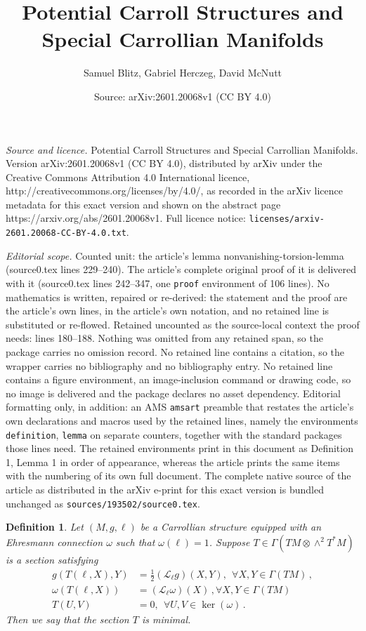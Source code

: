 \documentclass[10pt,a4paper]{amsart}
\title{Potential Carroll Structures and Special Carrollian Manifolds}
\author{Samuel Blitz, Gabriel Herczeg, David McNutt}
\date{Source: arXiv:2601.20068v1 (CC BY 4.0)}
\newtheorem{definition}{Definition}
\begin{document}
\maketitle

\noindent\emph{Source and licence.} Potential Carroll Structures and Special Carrollian Manifolds. Version arXiv:2601.20068v1 (CC BY 4.0), distributed by arXiv under the Creative Commons Attribution 4.0 International licence, http://creativecommons.org/licenses/by/4.0/, as recorded in the arXiv licence metadata for this exact version and shown on the abstract page https://arxiv.org/abs/2601.20068v1. Full licence notice: \texttt{licenses/arxiv-2601.20068-CC-BY-4.0.txt}.\par\smallskip

\noindent\textit{Editorial scope.} Counted unit: the article's lemma nonvanishing-torsion-lemma (source0.tex lines 229--240). The article's complete original proof of it is delivered with it (source0.tex lines 242--347, one \texttt{proof} environment of 106 lines). No mathematics is written, repaired or re-derived: the statement and the proof are the article's own lines, in the article's own notation, and no retained line is substituted or re-flowed.  Retained uncounted as the source-local context the proof needs: lines 180--188.  Nothing was omitted from any retained span, so the package carries no omission record.  No retained line contains a citation, so the wrapper carries no bibliography and no bibliography entry.  No retained line contains a figure environment, an image-inclusion command or drawing code, so no image is delivered and the package declares no asset dependency.  Editorial formatting only, in addition: an AMS \texttt{amsart} preamble that restates the article's own declarations and macros used by the retained lines, namely the environments \texttt{definition}, \texttt{lemma} on separate counters, together with the standard packages those lines need.  The retained environments print in this document as Definition 1, Lemma 1 in order of appearance, whereas the article prints the same items with the numbering of its own full document.  The complete native source of the article as distributed in the arXiv e-print for this exact version is bundled unchanged as \texttt{sources/193502/source0.tex}.
\begin{definition} \label{minimal-torsion-definition}
    Let $(M,g,\ell)$ be a Carrollian structure equipped with an Ehresmann connection $\omega$ such that $\omega(\ell) = 1$. Suppose $T \in \Gamma(TM \otimes \wedge^2 T^* M)$ is a section satisfying
        \begin{align}
        g(T(\ell,X), Y) &= \tfrac{1}{2} (\mathcal{L}_{\ell} g)(X,Y), ~~\forall X,Y \in \Gamma(T M)\,, \label{lie-g-constraint}\\
        \omega(T(\ell,X)) &= (\mathcal{L}_{\ell} \omega)(X) \,, \forall X,Y \in \Gamma(TM) \label{minimal-constraint} \\
        T(U,V) &= 0,~~\forall U,V \in \ker(\omega)\label{horiz-constraint}\,.
    \end{align}
    Then we say that the section $T$ is \textit{minimal}.
\end{definition}
\end{document}
